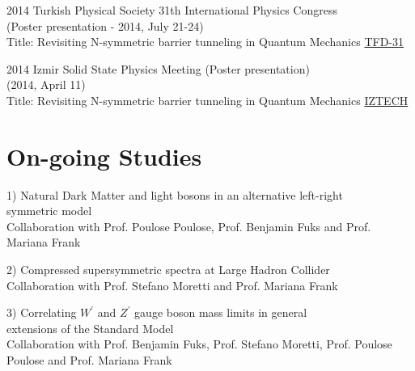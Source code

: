 \documentclass[]{friggeri-cv}
\begin{document}
\begin{entrylist}
	\entry
	{2014}
	{Turkish Physical Society 31th International Physics Congress \\ \normalfont (Poster presentation - 2014, July 21-24) \\
		Title: Revisiting N-symmetric barrier tunneling in Quantum Mechanics}
	{\href{http://www.tfd.com.tr/arsiv/TFD/31/en/default.htm}{TFD-31}}
	
	\entry
	{2014}
	{Izmir Solid State Physics Meeting  \normalfont (Poster presentation) \\ (2014, April 11) \\
		Title: Revisiting N-symmetric barrier tunneling in Quantum Mechanics}
	{\href{http://ymf.iyte.edu.tr/?page_id=234}{IZTECH}}
	
	
\end{entrylist}







\section{On-going Studies}

\begin{entrylist}
	
		\entry
{1)}
{Natural Dark Matter and light bosons in an alternative left-right \\ symmetric model \\ \normalfont
	Collaboration with Prof. Poulose Poulose, Prof. Benjamin Fuks and Prof. Mariana Frank}
{\href{https://www.mitacs.ca/en/programs/globalink/globalink-research-award}{}} 

		\entry
{2)}
{Compressed supersymmetric spectra at Large Hadron Collider \\ \normalfont
	Collaboration with Prof. Stefano Moretti and Prof. Mariana Frank}
{\href{https://www.mitacs.ca/en/programs/globalink/globalink-research-award}{}} 
	
		\entry
{3)}
{Correlating $W^\prime$ and $Z^\prime$ gauge boson mass limits in general \\ extensions of the Standard Model \\ \normalfont
	Collaboration with Prof. Benjamin Fuks, Prof. Stefano Moretti, Prof. Poulose Poulose and Prof. Mariana Frank}
{\href{https://www.mitacs.ca/en/programs/globalink/globalink-research-award}{}} 
	
\end{entrylist}	
\end{document}
